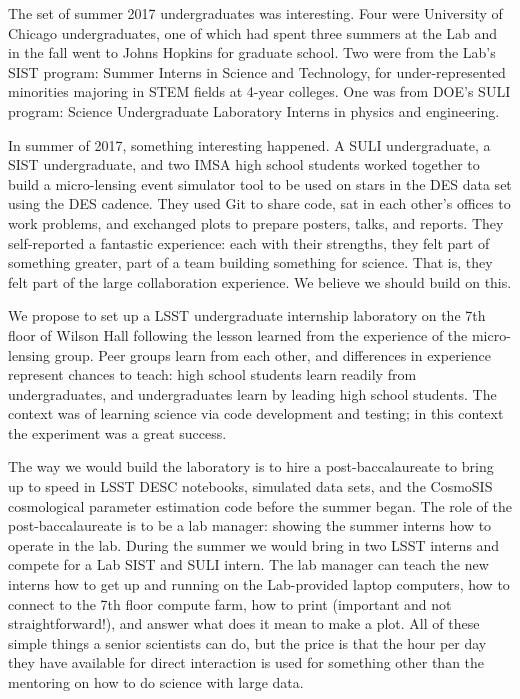 The set of summer 2017 undergraduates was interesting. Four were University of Chicago
undergraduates, one of which had spent three summers at the Lab
and in the fall went to Johns Hopkins for graduate school. 
Two were from the Lab's SIST program: Summer Interns in Science 
and Technology, for under-represented minorities majoring in STEM
fields at 4-year colleges. One was from DOE's SULI program: Science
Undergraduate Laboratory Interns in physics and engineering.

In summer of 2017, something interesting happened.
A SULI undergraduate, a SIST undergraduate, and two IMSA high school students worked
together to build a micro-lensing event simulator tool to be used
on stars in the DES data set using the DES cadence. They used Git
to share code, sat in each other's offices to work problems, and
exchanged plots to prepare posters, talks, and reports. 
They self-reported a fantastic experience: each with their strengths,
they felt part of something greater, part of a team building something 
for science. That is, they felt part of the large collaboration experience.
We believe we should build on this.

We propose to set up a LSST undergraduate internship laboratory
on the 7th floor of Wilson Hall following the lesson
learned from the experience of the micro-lensing group. 
Peer groups learn from each other,
and differences in experience represent chances to teach: high school
students learn readily from undergraduates, and undergraduates learn
by leading high school students. The context was of learning science
via code development and testing; in this context the experiment was a great
success.

\newpage
The way we would build the laboratory is
to hire a post-baccalaureate to bring up to
speed in LSST DESC notebooks, simulated data sets, and the CosmoSIS
cosmological parameter estimation code  before the
summer began.  The role of the
post-baccalaureate is to be a lab manager: showing the summer interns
how to operate in the lab.
During the summer we would bring in two LSST interns
and compete for a Lab SIST and SULI intern.  The lab manager can
teach the new interns how to get up and running on the Lab-provided
laptop computers, how to connect to the 7th floor compute farm,
how to print (important and not straightforward!), and answer what does
it mean to make a plot. All of these simple things a senior
scientists can do, but the price is that the hour per day they have 
available for direct interaction is used for something other than 
the mentoring on how to do science with large data.

